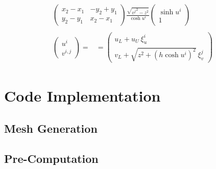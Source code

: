 \documentclass [10pt,letterpaper]{article}
\begin{document}
\begin{subequations}
\begin{align}
\begin{split}
			\begin{pmatrix} 
				x_2-x_1 	& 	-y_2+y_1	\\
				y_2-y_1 	& 	x_2-x_1		
			\end{pmatrix}
			\frac{ \sqrt{{v^j}^2-z^2} } { \cosh{u^i} } 
			\begin{pmatrix}
				\sinh{u^i}				\\
				1
			\end{pmatrix}
		\end{split}
		\\
		\begin{split} 
			\begin{pmatrix}
				u^i					\\
				v^{i,j}
			\end{pmatrix}
			=&
			=
			\begin{pmatrix} 
				u_L
				+ 
				u_U
				\ \xi_u^i				\\
				v_L
				+ 
				\sqrt{ z^2 + (h \cosh{u^i})^2 }
				\ \xi_v^j				
			\end{pmatrix}
		\end{split}
	\end{align}
\end{subequations}






\section{Code Implementation}
\label{sec:code-implementation}
\subsection{Mesh Generation}
\label{sub:mesh-generation}
\subsection{Pre-Computation}
\label{sub:pre-computation}
\end{document}
